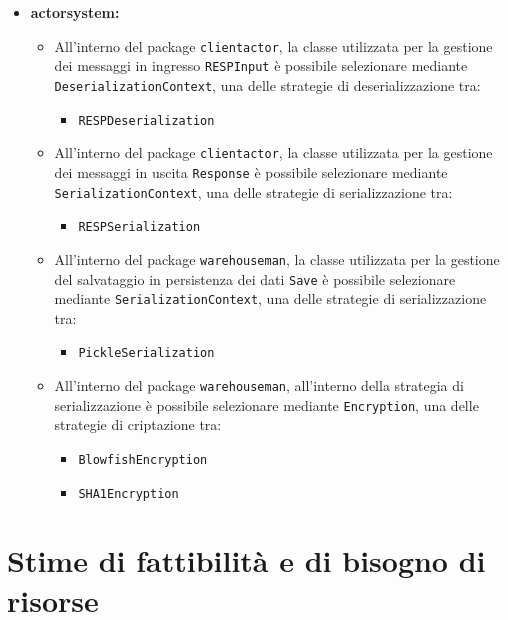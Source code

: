 \documentclass{scalatekids-article}
\begin{document}
\begin{itemize}
\begin{itemize}
  \item \bf{actorsystem:}
    \begin{itemize}
    \item All'interno del package \verb=clientactor=, la classe utilizzata per la
      gestione dei messaggi in ingresso \verb=RESPInput= è possibile selezionare
      mediante \verb=DeserializationContext=, una delle strategie di deserializzazione
      tra:
      \begin{itemize}
      \item \verb=RESPDeserialization=
      \end{itemize}
    \item All'interno del package \verb=clientactor=, la classe utilizzata per la
      gestione dei messaggi in uscita \verb=Response= è possibile selezionare
      mediante \verb=SerializationContext=, una delle strategie di serializzazione
      tra:
      \begin{itemize}
      \item \verb=RESPSerialization=
      \end{itemize}
    \item All'interno del package \verb=warehouseman=, la classe utilizzata per
      la gestione del salvataggio in persistenza dei dati \verb=Save= è
      possibile selezionare mediante \verb=SerializationContext=, una delle
      strategie di serializzazione tra:
      \begin{itemize}
      \item \verb=PickleSerialization=
      \end{itemize}
    \item All'interno del package \verb=warehouseman=, all'interno della
      strategia di serializzazione è possibile selezionare mediante
      \verb=Encryption=, una delle strategie di criptazione tra:
      \begin{itemize}
      \item \verb=BlowfishEncryption=
      \item \verb=SHA1Encryption=
      \end{itemize}
    \end{itemize}

  \end{itemize}

\end{itemize}

\section{Stime di fattibilità e di bisogno di risorse}
\end{document}
